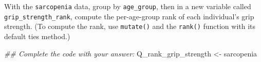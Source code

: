 \documentclass[
  letterpaper,
  DIV=11,
  numbers=noendperiod]{scrreprt}
\newenvironment{Shaded}{\begin{snugshade}}{\end{snugshade}}
\newcommand{\DocumentationTok}[1]{\textcolor[rgb]{0.37,0.37,0.37}{\textit{#1}}}
\newcommand{\NormalTok}[1]{\textcolor[rgb]{0.00,0.23,0.31}{#1}}
\newcommand{\OtherTok}[1]{\textcolor[rgb]{0.00,0.23,0.31}{#1}}
\begin{document}
\begin{tcolorbox}[enhanced jigsaw, title=\textcolor{quarto-callout-tip-color}{\faLightbulb}\hspace{0.5em}{Practice}, colbacktitle=quarto-callout-tip-color!10!white, leftrule=.75mm, arc=.35mm, opacityback=0, bottomrule=.15mm, rightrule=.15mm, toptitle=1mm, breakable, toprule=.15mm, colback=white, coltitle=black, colframe=quarto-callout-tip-color-frame, bottomtitle=1mm, titlerule=0mm, left=2mm, opacitybacktitle=0.6]

With the \texttt{sarcopenia} data, group by \texttt{age\_group}, then in
a new variable called \texttt{grip\_strength\_rank}, compute the
per-age-group rank of each individual's grip strength. (To compute the
rank, use \texttt{mutate()} and the \texttt{rank()} function with its
default ties method.)

\begin{Shaded}
\begin{Highlighting}[]
\DocumentationTok{\#\# Complete the code with your answer:}
\NormalTok{Q\_rank\_grip\_strength }\OtherTok{\textless{}{-}} 
\NormalTok{  sarcopenia}
\end{Highlighting}
\end{Shaded}

\end{tcolorbox}
\end{document}
